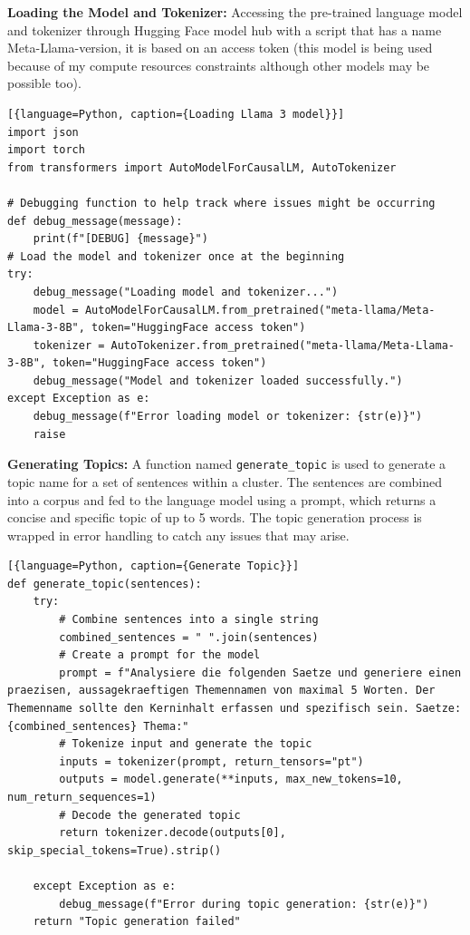 \noindent\textbf{Loading the Model and Tokenizer:} Accessing the pre-trained language model and tokenizer through Hugging 
Face model hub with a script that has a name Meta-Llama-version, it is based on an 
access token (this model is being used because of my compute resources constraints although other models may be possible too).
\begin{lstlisting}[{language=Python, caption={Loading Llama 3 model}}]
import json
import torch
from transformers import AutoModelForCausalLM, AutoTokenizer

# Debugging function to help track where issues might be occurring
def debug_message(message):
    print(f"[DEBUG] {message}")
# Load the model and tokenizer once at the beginning
try:
    debug_message("Loading model and tokenizer...")
    model = AutoModelForCausalLM.from_pretrained("meta-llama/Meta-Llama-3-8B", token="HuggingFace access token")
    tokenizer = AutoTokenizer.from_pretrained("meta-llama/Meta-Llama-3-8B", token="HuggingFace access token")
    debug_message("Model and tokenizer loaded successfully.")
except Exception as e:
    debug_message(f"Error loading model or tokenizer: {str(e)}")
    raise
\end{lstlisting}

\noindent\textbf{Generating Topics:} A function named \texttt{generate\_topic} is used to generate a topic name for a set
 of sentences within a cluster. The sentences are combined into a corpus and fed to the language model using a prompt,
  which returns a concise and specific topic of up to 5 words. 
The topic generation process is wrapped in error handling to catch any issues that may arise. 
\begin{lstlisting}[{language=Python, caption={Generate Topic}}]
def generate_topic(sentences):
    try:
        # Combine sentences into a single string
        combined_sentences = " ".join(sentences)  
        # Create a prompt for the model
        prompt = f"Analysiere die folgenden Saetze und generiere einen praezisen, aussagekraeftigen Themennamen von maximal 5 Worten. Der Themenname sollte den Kerninhalt erfassen und spezifisch sein. Saetze: {combined_sentences} Thema:"
        # Tokenize input and generate the topic
        inputs = tokenizer(prompt, return_tensors="pt")
        outputs = model.generate(**inputs, max_new_tokens=10, num_return_sequences=1)
        # Decode the generated topic
        return tokenizer.decode(outputs[0], skip_special_tokens=True).strip()
            
    except Exception as e:
        debug_message(f"Error during topic generation: {str(e)}")
    return "Topic generation failed"
\end{lstlisting}

